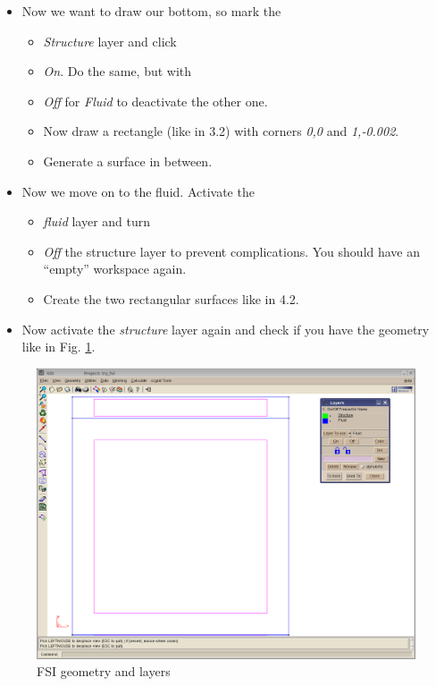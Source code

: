 \begin{itemize}
\item Now we want to draw our bottom, so mark the \emph{}

\begin{itemize}
\item \emph{Structure} layer and click
\item \emph{On}. Do the same, but with \emph{}
\item \emph{Off} for \emph{Fluid} to deactivate the other one.
\item Now draw a rectangle (like in 3.2) with corners \emph{0,0} and \emph{1,-0.002}.
\item Generate a surface in between.
\end{itemize}
\item Now we move on to the fluid. Activate the \emph{}

\begin{itemize}
\item \emph{fluid} layer and turn
\item \emph{Off} the structure layer to prevent complications. You should
have an {}``empty'' workspace again.
\item Create the two rectangular surfaces like in 4.2.
\end{itemize}
\item Now activate the \emph{structure} layer again and check if you have
the geometry like in Fig. \ref{tut_fsi:5.2}.
\end{itemize}
%
\begin{figure}[h]
\includegraphics[scale=0.4]{Bilder/fsi_02}


\caption{\label{tut_fsi:5.2} FSI geometry and layers}
\end{figure}


